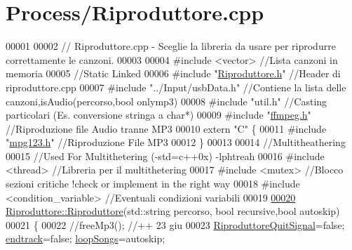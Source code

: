 \hypertarget{Riproduttore_8cpp_source}{\section{\-Process/\-Riproduttore.cpp}
}

\begin{DoxyCode}
00001 
00002 \textcolor{comment}{// Riproduttore.cpp - Sceglie la libreria da usare per riprodurre correttamente
       le canzoni.}
00003 
00004 \textcolor{preprocessor}{#include <vector>}                   \textcolor{comment}{//Lista canzoni in memoria}
00005 \textcolor{comment}{//Static Linked}
00006 \textcolor{preprocessor}{#include "\hyperlink{Riproduttore_8h}{Riproduttore.h}"}           \textcolor{comment}{//Header di riproduttore.cpp}
00007 \textcolor{preprocessor}{#include "../Input/usbData.h"}       \textcolor{comment}{//Contiene la lista delle
       canzoni,isAudio(percorso,bool onlymp3)}
00008 \textcolor{preprocessor}{#include "util.h"}                   \textcolor{comment}{//Casting particolari (Es. conversione
       stringa a char*)}
00009 \textcolor{preprocessor}{#include "\hyperlink{ffmpeg_8h}{ffmpeg.h}"}             \textcolor{comment}{//Riproduzione file Audio tranne MP3}
00010 \textcolor{keyword}{extern} \textcolor{stringliteral}{"C"} \{
00011 \textcolor{preprocessor}{#include "\hyperlink{mpg123_8h}{mpg123.h}"}             \textcolor{comment}{//Riproduzione File MP3}
00012 \}
00013 
00014 \textcolor{comment}{//Multitheathering}
00015 \textcolor{comment}{//Used For Multithetering (-std=c++0x) -lphtreah}
00016 \textcolor{preprocessor}{#include <thread>}                                   \textcolor{comment}{//Libreria per il
       multithetering}
00017 \textcolor{preprocessor}{#include <mutex>}                                    \textcolor{comment}{//Blocco sezioni critiche
       !check or implement in the right way}
00018 \textcolor{preprocessor}{#include <condition\_variable>}                       \textcolor{comment}{//Eventuali condizioni
       variabili}
00019 
\hypertarget{Riproduttore_8cpp_source_l00020}{}\hyperlink{classRiproduttore_ab01a4e52bcc2735e94f547b32906f3a2}{00020} \hyperlink{classRiproduttore_ab01a4e52bcc2735e94f547b32906f3a2}{Riproduttore::Riproduttore}(std::string percorso, \textcolor{keywordtype}{bool} recursive,\textcolor{keywordtype}{bool} autoskip)
00021 \{
00022     \textcolor{comment}{//freeMp3(); //++ 23 giu}
00023     \hyperlink{classRiproduttore_a7430cced443dd19e50d266470bf3bba6}{RiproduttoreQuitSignal}=\textcolor{keyword}{false}; \hyperlink{classRiproduttore_a865f72d47671c15cbc5bdcae6818e264}{endtrack}=\textcolor{keyword}{false}; \hyperlink{classRiproduttore_a25a08a505bbd71239fa4c20e0a4ddfff}{loopSongs}=autoskip;

\end{DoxyCode}
